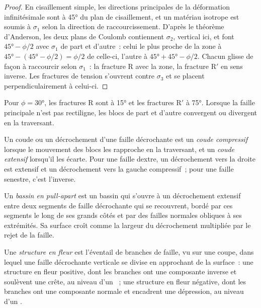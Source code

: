 \begin{proof}
En cisaillement simple, les directions principales de la déformation infinitésimale sont à
\ang{45} du plan de cisaillement, et un matériau isotrope est soumis à
$\sigma_1$ selon la direction de raccourcissement. D'après le théorème d'Anderson, les deux plans de Coulomb
contiennent $\sigma_2$, vertical ici, et font $\ang{45} - \phi/2$ avec
$\sigma_1$ de part et d'autre~: celui le plus proche de la zone à $\ang{45} -
(\ang{45} - \phi/2) = \phi/2$ de celle-ci, l'autre à $\ang{45} + \ang{45} -
\phi/2$. Chacun glisse de façon à raccourcir selon $\sigma_1$~: la fracture R avec la
zone, la fracture R$'$ en sens inverse. Les fractures de tension s'ouvrent contre $\sigma_3$ et
se placent perpendiculairement à celui-ci.
\end{proof}

Pour $\phi = \ang{30}$, les fractures R sont à \ang{15} et les fractures R$'$ à
\ang{75}. Lorsque la faille principale n'est pas rectiligne, les blocs de part et d'autre
convergent ou divergent en la traversant.

\begin{definition}\label{def:b3:extension-strike-slip:bends}
Un coude ou un décrochement d'une faille décrochante est un \emph{coude
compressif} lorsque le mouvement des blocs les rapproche
en la traversant, et un \emph{coude extensif} lorsqu'il
les écarte. Pour une faille dextre, un décrochement vers la droite est extensif et un
décrochement vers la gauche compressif~; pour une faille senestre, c'est l'inverse.
\end{definition}

\begin{definition}\label{def:b3:extension-strike-slip:pull-apart}
Un \emph{bassin en pull-apart} est un bassin qui s'ouvre à un
décrochement extensif entre deux segments de faille décrochante qui se recouvrent, bordé par
ces segments le long de ses grands côtés et par des failles normales obliques à ses extrémités.
Sa surface croît comme la largeur du décrochement multipliée par le rejet de la faille.
\end{definition}

\begin{definition}\label{def:b3:extension-strike-slip:flower}
Une \emph{structure en fleur} est l'éventail de branches de faille,
vu sur une coupe, dans lequel une faille décrochante verticale se divise en approchant
de la surface~: une structure en fleur positive, dont les branches ont une composante inverse
et soulèvent une crête, au niveau d'un ~; une structure en fleur négative, dont les branches ont
une composante normale et encadrent une dépression, au niveau d'un .
\end{definition}

